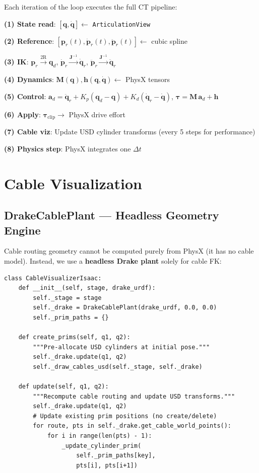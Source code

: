 \documentclass[11pt,a4paper]{article}
\newcommand{\bq}{\bm{q}}
\newcommand{\bdq}{\dot{\bm{q}}}
\newcommand{\bddq}{\ddot{\bm{q}}}
\newcommand{\btau}{\bm{\tau}}
\newcommand{\bM}{\bm{M}}
\newcommand{\bh}{\bm{h}}
\newcommand{\bJ}{\bm{J}}
\begin{document}
\begin{codemath}
Each iteration of the loop executes the full CT pipeline:

\textbf{(1) State read}: $[\bq, \bdq] \leftarrow$ \texttt{ArticulationView}

\textbf{(2) Reference}: $[\bm{p}_r(t), \dot{\bm{p}}_r(t), \ddot{\bm{p}}_r(t)] \leftarrow$ cubic spline

\textbf{(3) IK}: $\bm{p}_r \xrightarrow{\text{2R}} \bq_d$, \quad $\dot{\bm{p}}_r \xrightarrow{\bJ^{-1}} \bdq_r$, \quad $\ddot{\bm{p}}_r \xrightarrow{\bJ^{-1}} \bddq_r$

\textbf{(4) Dynamics}: $\bM(\bq), \bh(\bq,\bdq) \leftarrow$ PhysX tensors

\textbf{(5) Control}: $\bm{a}_d = \bddq_r + K_p(\bq_d - \bq) + K_d(\bdq_r - \bdq)$, \; $\btau = \bM\,\bm{a}_d + \bh$

\textbf{(6) Apply}: $\btau_{\mathrm{clip}} \to$ PhysX drive effort

\textbf{(7) Cable viz}: Update USD cylinder transforms (every 5 steps for performance)

\textbf{(8) Physics step}: PhysX integrates one $\Delta t$
\end{codemath}


\section{Cable Visualization}
\label{sec:cable_viz}

\subsection{DrakeCablePlant --- Headless Geometry Engine}

Cable routing geometry cannot be computed purely from PhysX (it has no cable model). Instead, we use a \textbf{headless Drake plant} solely for cable FK:

\begin{lstlisting}[caption={Cable visualization wrapper --- \texttt{project\_utils/viz\_cables\_isaacsim.py}}]
class CableVisualizerIsaac:
    def __init__(self, stage, drake_urdf):
        self._stage = stage
        self._drake = DrakeCablePlant(drake_urdf, 0.0, 0.0)
        self._prim_paths = {}

    def create_prims(self, q1, q2):
        """Pre-allocate USD cylinders at initial pose."""
        self._drake.update(q1, q2)
        self._draw_cables_usd(self._stage, self._drake)

    def update(self, q1, q2):
        """Recompute cable routing and update USD transforms."""
        self._drake.update(q1, q2)
        # Update existing prim positions (no create/delete)
        for route, pts in self._drake.get_cable_world_points():
            for i in range(len(pts) - 1):
                _update_cylinder_prim(
                    self._prim_paths[key],
                    pts[i], pts[i+1])
\end{lstlisting}
\end{document}
